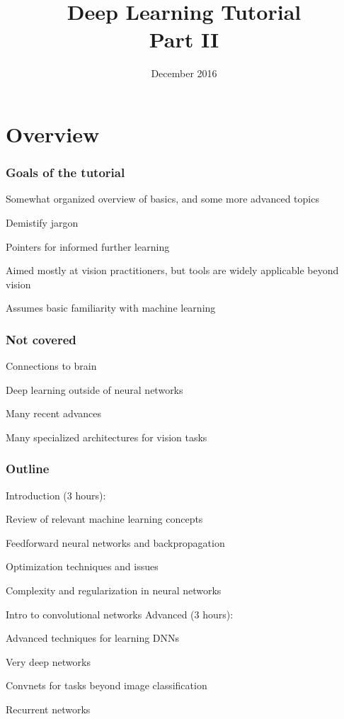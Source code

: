\documentclass[xcolor=dvipsnames]{beamer}
\title{Deep Learning Tutorial\\Part II}
\institute{%
  \vspace{-1em}\begin{minipage}[t]{.25\linewidth}%
    \vspace{-3em}%
    \texttt{[image: tticlogo]}\vspace{2em}%
  \end{minipage}%
  \begin{minipage}[t]{.5\linewidth}%
    {\Large Greg Shakhnarovich}\\{\Large TTI-Chicago\vspace{2em}}%
  \end{minipage}%
}
\date{December 2016}
\begin{document}
\maketitle

\section{Overview}

\begin{frame}
  \frametitle{Goals of the tutorial}
\bi
\item Somewhat organized overview of basics, and some more advanced
  topics
\item Demistify jargon
\item Pointers for informed further learning
\item Aimed mostly at vision practitioners, but tools are widely
  applicable beyond vision
\item Assumes basic familiarity with machine learning
\ei  
\end{frame}

\begin{frame}
  \frametitle{Not covered}
  \bi
\item Connections to brain
\item Deep learning outside of neural networks
\item Many recent advances
\item Many specialized architectures for vision tasks
\ei
\end{frame}


\begin{frame}
  \frametitle{Outline}
Introduction (3 hours):
\bi
\item Review of relevant machine learning concepts
\item Feedforward neural networks and backpropagation
\item Optimization techniques and issues
\item Complexity and regularization in neural networks
\item Intro to convolutional networks
\ei
Advanced (3 hours):
\bi
\item Advanced techniques for learning DNNs
\item Very deep networks
\item Convnets for tasks beyond image classification
\item Recurrent networks
\ei
\end{frame}
\end{document}

